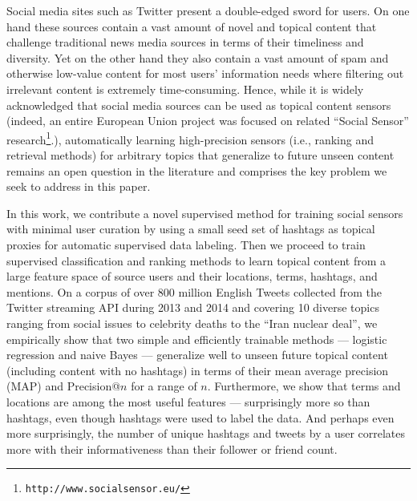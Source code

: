 
\label{sec:introduction}

Social media sites such as Twitter present a double-edged sword for
users.  On one hand these sources contain a vast amount of novel and
topical content that challenge traditional news media sources in terms
of their timeliness and diversity.  Yet on the other hand they also
contain a vast amount of spam and otherwise low-value content for most
users' information needs where filtering out irrelevant content is
extremely time-consuming.  Hence, while it is widely acknowledged that
social media sources can be used as topical content sensors (indeed,
an entire European Union project was focused on related ``Social Sensor''
research\footnote{\texttt{http://www.socialsensor.eu/}}.),
automatically learning high-precision sensors (i.e., ranking and
retrieval methods) for arbitrary topics that generalize to future
unseen content remains an open question in the literature and
comprises the key problem we seek to address in this paper.

In this work, we contribute a novel supervised method for training
social sensors with minimal user curation by using a small seed set of
hashtags as topical proxies for automatic supervised data labeling.
Then we proceed to train supervised classification and ranking methods
to learn topical content from a large feature space of source users
and their locations, terms, hashtags, and mentions.  On a corpus of
over 800 million English Tweets collected from the Twitter streaming
API during 2013 and 2014 and covering 10 diverse topics ranging from
social issues to celebrity deaths to the ``Iran nuclear deal'', we
empirically show that two simple and efficiently trainable methods ---
logistic regression and naive Bayes --- generalize well to unseen
future topical content (including content with no hashtags) in terms
of their mean average precision (MAP) and Precision@$n$ for a range of
$n$.  Furthermore, we show that terms and locations are among the most
useful features --- surprisingly more so than hashtags, even though
hashtags were used to label the data.  And perhaps even more
surprisingly, the number of unique hashtags and tweets by a user
correlates more with their informativeness than their follower or
friend count.

